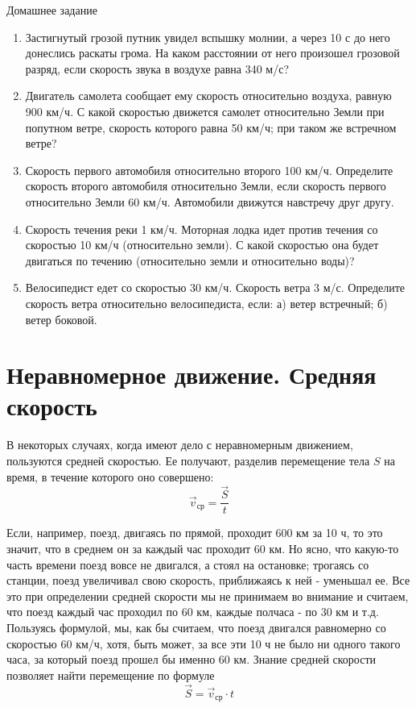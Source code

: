 \documentclass[a5paper, 10pt]{diss_4}
\renewcommand{\'}{\,'}
\begin{document}
\begin{center}
   Домашнее задание
\end{center}
\begin{enumerate}
\item Застигнутый грозой путник увидел вспышку молнии, а через 10 с до него донеслись раскаты грома. На каком расстоянии от него произошел грозовой разряд, если скорость звука в воздухе равна 340 м/с?
\item Двигатель самолета сообщает ему скорость относительно воздуха, равную 900 км/ч. С какой скоростью движется самолет относительно Земли при попутном ветре, скорость которого равна 50 км/ч; при таком же встречном ветре?
\item Скорость первого автомобиля относительно второго 100 км/ч. Определите скорость второго автомобиля относительно Земли, если скорость первого относительно Земли 60 км/ч. Автомобили движутся навстречу друг другу.
\item Скорость течения реки 1 км/ч. Моторная лодка идет против течения со скоростью 10 км/ч (относительно земли). С какой скоростью она будет двигаться по течению (относительно земли и относительно воды)?
\item Велосипедист едет со скоростью 30 км/ч. Скорость ветра 3 м/с. Определите скорость ветра относительно велосипедиста, если: а) ветер встречный; б) ветер боковой.
\end{enumerate}


\section{Неравномерное движение. Средняя скорость}

 В некоторых случаях, когда имеют дело с неравномерным движением, пользуются
средней скоростью. Ее получают, разделив перемещение тела $S$ на время, в течение
которого оно совершено:
\[\vec{v}_{ср}=\frac{\vec{S}}{t}\]

 Если, например, поезд, двигаясь по прямой, проходит 600 км за 10 ч, то это
значит, что в среднем он за каждый час проходит 60 км. Но ясно, что какую-то
часть времени поезд вовсе не двигался, а стоял на остановке; трогаясь со
станции, поезд увеличивал свою скорость, приближаясь к ней - уменьшал ее. Все
это при определении средней скорости мы не принимаем во внимание и считаем, что
поезд каждый час проходил по 60 км, каждые полчаса - по 30 км и т.д. Пользуясь
формулой, мы, как бы считаем, что поезд двигался равномерно со скоростью 60
км/ч, хотя, быть может, за все эти 10 ч не было ни одного такого часа, за
который поезд прошел бы именно 60 км. Знание средней скорости позволяет найти
перемещение по формуле
\[\vec{S}=\vec{v}_{ср}\cdot t\]
\end{document}
